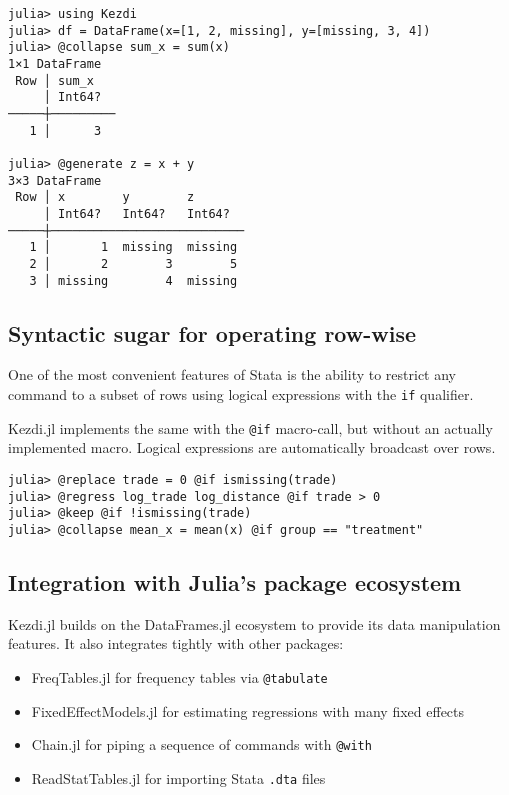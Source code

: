 \documentclass{juliacon}
\begin{document}
\begin{verbatim}
julia> using Kezdi
julia> df = DataFrame(x=[1, 2, missing], y=[missing, 3, 4])
julia> @collapse sum_x = sum(x)
1×1 DataFrame
 Row │ sum_x   
     │ Int64?  
─────┼─────────
   1 │      3

julia> @generate z = x + y
3×3 DataFrame
 Row │ x        y        z
     │ Int64?   Int64?   Int64?
─────┼───────────────────────────
   1 │       1  missing  missing
   2 │       2        3        5
   3 │ missing        4  missing
\end{verbatim}

\subsection{Syntactic sugar for operating row-wise}

One of the most convenient features of Stata is the ability to restrict any command to a subset of rows using logical expressions with the \texttt{if} qualifier.

Kezdi.jl implements the same with the \texttt{@if} macro-call, but without an actually implemented macro. Logical expressions are automatically broadcast over rows.

\begin{verbatim}
julia> @replace trade = 0 @if ismissing(trade)
julia> @regress log_trade log_distance @if trade > 0
julia> @keep @if !ismissing(trade) 
julia> @collapse mean_x = mean(x) @if group == "treatment"
\end{verbatim}

\subsection{Integration with Julia's package ecosystem}

Kezdi.jl builds on the DataFrames.jl ecosystem \cite{DataFrame.jl2023} to provide its data manipulation features. It also integrates tightly with other packages:

\begin{itemize}
	\item FreqTables.jl \cite{FreqTables.jl2023} for frequency tables via \texttt{@tabulate}
	\item FixedEffectModels.jl \cite{FixedEffectModels.jl2023} for estimating regressions with many fixed effects
	\item Chain.jl for piping a sequence of commands with \texttt{@with}
	\item ReadStatTables.jl for importing Stata \texttt{.dta} files
\end{itemize}
\end{document}
